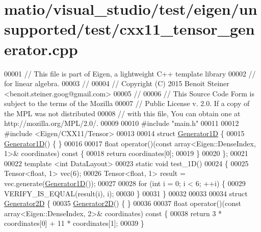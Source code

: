 \hypertarget{matio_2visual__studio_2test_2eigen_2unsupported_2test_2cxx11__tensor__generator_8cpp_source}{}\section{matio/visual\+\_\+studio/test/eigen/unsupported/test/cxx11\+\_\+tensor\+\_\+generator.cpp}
\label{matio_2visual__studio_2test_2eigen_2unsupported_2test_2cxx11__tensor__generator_8cpp_source}

\begin{DoxyCode}
00001 \textcolor{comment}{// This file is part of Eigen, a lightweight C++ template library}
00002 \textcolor{comment}{// for linear algebra.}
00003 \textcolor{comment}{//}
00004 \textcolor{comment}{// Copyright (C) 2015 Benoit Steiner <benoit.steiner.goog@gmail.com>}
00005 \textcolor{comment}{//}
00006 \textcolor{comment}{// This Source Code Form is subject to the terms of the Mozilla}
00007 \textcolor{comment}{// Public License v. 2.0. If a copy of the MPL was not distributed}
00008 \textcolor{comment}{// with this file, You can obtain one at http://mozilla.org/MPL/2.0/.}
00009 
00010 \textcolor{preprocessor}{#include "main.h"}
00011 
00012 \textcolor{preprocessor}{#include <Eigen/CXX11/Tensor>}
00013 
00014 \textcolor{keyword}{struct }\hyperlink{struct_generator1_d}{Generator1D} \{
00015   \hyperlink{struct_generator1_d}{Generator1D}() \{ \}
00016 
00017   \textcolor{keywordtype}{float} operator()(\textcolor{keyword}{const} array<Eigen::DenseIndex, 1>& coordinates)\textcolor{keyword}{ const }\{
00018     \textcolor{keywordflow}{return} coordinates[0];
00019   \}
00020 \};
00021 
00022 \textcolor{keyword}{template} <\textcolor{keywordtype}{int} DataLayout>
00023 \textcolor{keyword}{static} \textcolor{keywordtype}{void} test\_1D()
00024 \{
00025   Tensor<float, 1> vec(6);
00026   Tensor<float, 1> result = vec.generate(\hyperlink{struct_generator1_d}{Generator1D}());
00027 
00028   \textcolor{keywordflow}{for} (\textcolor{keywordtype}{int} i = 0; i < 6; ++i) \{
00029     VERIFY\_IS\_EQUAL(result(i), i);
00030   \}
00031 \}
00032 
00033 
00034 \textcolor{keyword}{struct }\hyperlink{struct_generator2_d}{Generator2D} \{
00035   \hyperlink{struct_generator2_d}{Generator2D}() \{ \}
00036 
00037   \textcolor{keywordtype}{float} operator()(\textcolor{keyword}{const} array<Eigen::DenseIndex, 2>& coordinates)\textcolor{keyword}{ const }\{
00038     \textcolor{keywordflow}{return} 3 * coordinates[0] + 11 * coordinates[1];
00039   \}

\end{DoxyCode}
